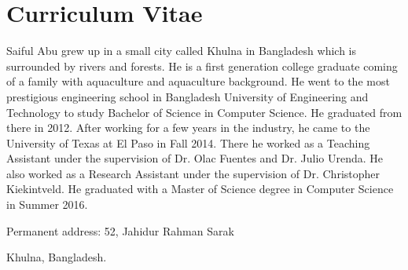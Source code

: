 
\chapter*{Curriculum Vitae}

Saiful Abu grew up in a small city called Khulna in Bangladesh which is surrounded by rivers and forests. He is a first generation college graduate coming of a family with aquaculture and aquaculture background. He went to the most prestigious engineering school in Bangladesh University of Engineering and Technology to study Bachelor of Science in Computer Science. He graduated from there in 2012. After working for a few years in the industry, he came to the University of Texas at El Paso in Fall 2014. There he worked as a Teaching Assistant under the supervision of Dr. Olac Fuentes and Dr. Julio Urenda. He also worked as a Research Assistant under the supervision of Dr. Christopher Kiekintveld. He graduated with a Master of Science degree in Computer Science in Summer 2016. 



\medskip

\noindent
Permanent address: 52, Jahidur Rahman Sarak

\noindent
\hspace{1.42in}
Khulna, Bangladesh.

\vfill



